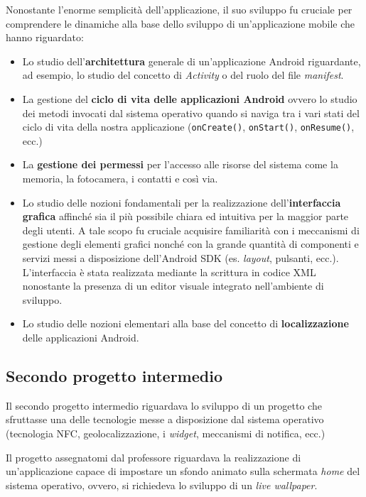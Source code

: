 \documentclass[10pt,a4paper, titlepage]{article}
\begin{document}
Nonostante l'enorme semplicità dell'applicazione, il suo sviluppo fu cruciale per comprendere le dinamiche alla base dello sviluppo di un'applicazione mobile che hanno riguardato:
\begin{itemize}
\item Lo studio dell'\textbf{architettura} generale di un'applicazione Android riguardante, ad esempio, lo studio del concetto di \textit{Activity} o del ruolo del file \textit{manifest}.
\item La gestione del \textbf{ciclo di vita delle applicazioni Android} ovvero lo studio dei metodi invocati dal sistema operativo quando si naviga tra i vari stati del ciclo di vita della nostra applicazione (\texttt{onCreate()}, \texttt{onStart()}, \texttt{onResume()}, ecc.)
\item La \textbf{gestione dei permessi} per l'accesso alle risorse del sistema come la memoria, la fotocamera, i contatti e così via.
\item Lo studio delle nozioni fondamentali per la realizzazione dell'\textbf{interfaccia grafica} affinché sia il più possibile chiara ed intuitiva per la maggior parte degli utenti. A tale scopo fu cruciale acquisire familiarità con i meccanismi di gestione degli elementi grafici nonché con la grande quantità di componenti e servizi messi a disposizione dell'Android SDK (es. \textit{layout}, pulsanti, ecc.). L'interfaccia è stata realizzata mediante la scrittura in codice XML nonostante la presenza di un editor visuale integrato nell'ambiente di sviluppo.
\item Lo studio delle nozioni elementari alla base del concetto di \textbf{localizzazione} delle applicazioni Android.
\end{itemize}

\subsection{Secondo progetto intermedio}

Il secondo progetto intermedio riguardava lo sviluppo di un progetto che sfruttasse una delle tecnologie messe a disposizione dal sistema operativo (tecnologia NFC, geolocalizzazione, i \textit{widget}, meccanismi di notifica, ecc.)

Il progetto assegnatomi dal professore riguardava la realizzazione di un'applicazione capace di impostare un sfondo animato sulla schermata \textit{home} del sistema operativo, ovvero, si richiedeva lo sviluppo di un \textit{live wallpaper}.
\end{document}
